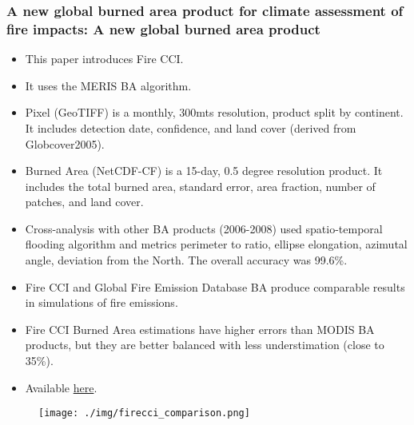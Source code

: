 \documentclass{beamer}
\begin{document}
\begin{frame}[t, allowframebreaks]
    \frametitle{A new global burned area product for climate assessment of fire 
    impacts: A new global burned area product~\cite{chuvieco2016}}
    \begin{itemize}
        \item This paper introduces Fire CCI.
        \item It uses the MERIS BA algorithm.
        \item Pixel (GeoTIFF) is a monthly, 300mts resolution, product 
            split by continent. It includes detection date, confidence, and 
            land cover (derived from Globcover2005).
        \item Burned Area (NetCDF-CF) is a 15-day, 0.5 degree resolution 
            product. It includes the total burned area, standard error, area 
            fraction, number of patches, and land cover.
        \item Cross-analysis with other BA products (2006-2008) used 
            spatio-temporal flooding algorithm and metrics perimeter to ratio, 
            ellipse elongation, azimutal angle, deviation from the North. The
            overall accuracy was 99.6\%.
        \item Fire CCI and Global Fire Emission Database BA produce comparable 
            results in simulations of fire emissions.
        \item Fire CCI Burned Area estimations have higher errors than MODIS BA
            products, but they are better balanced with less understimation 
            (close to 35\%).
        \item Available \href{https://climate.esa.int/de/projects/fire/}{here}.
    \end{itemize}
    \begin{figure}
        \centering
        \texttt{[image: ./img/firecci\_comparison.png]}
    \end{figure}
\end{frame}
\end{document}
